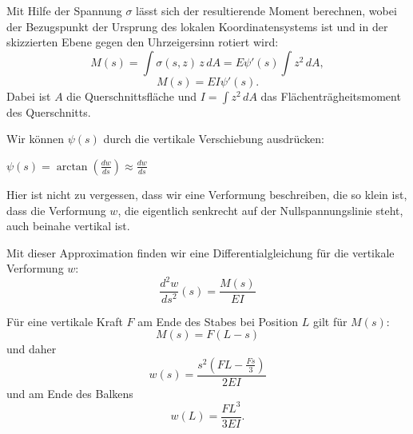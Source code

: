 \begin{otherlanguage}{ngerman}
Mit Hilfe der Spannung $\sigma$ lässt sich der resultierende Moment
berechnen, wobei der Bezugspunkt der Ursprung des lokalen
Koordinatensystems ist und in der skizzierten Ebene gegen den
Uhrzeigersinn rotiert wird:
\[
  M(s) = \int \sigma(s,z)\, z \, dA = E \psi'(s) \int z^2 \, dA ,
\]
\[
  M(s) = E I \psi'(s) .
\]
Dabei ist $A$ die Querschnittsfläche und $I = \int z^2 \, dA$ das
Flächenträgheitsmoment des Querschnitts.

Wir können $\psi(s)$ durch die vertikale Verschiebung ausdrücken:
\begin{center}
\qquad
$\displaystyle \psi(s) = \arctan\left(\frac{dw}{ds}\right) \approx \frac{dw}{ds}$
\end{center}
Hier ist nicht zu vergessen, dass wir eine Verformung beschreiben, die so
klein ist, dass die Verformung $w$, die eigentlich senkrecht auf der
Nullspannungslinie steht, auch beinahe vertikal ist.

Mit dieser Approximation finden wir eine Differentialgleichung für die
vertikale Verformung $w$:
\begin{equation}
  \boxed{\frac{d^2 w}{ds^2}(s) = \frac{M(s)}{EI}}
  \label{eq:beam-ode}
\end{equation}

Für eine vertikale Kraft $F$ am Ende des Stabes bei Position $L$ gilt für
$M(s)$:
\[
  M(s) = F(L - s)
\]
und daher
\[
  w(s) = \frac{s^2 \left(FL - \frac{Fs}{3}\right)}{2EI}
\]
und am Ende des Balkens
\[
  w(L) = \frac{FL^3}{3EI} .
\]

\end{otherlanguage}